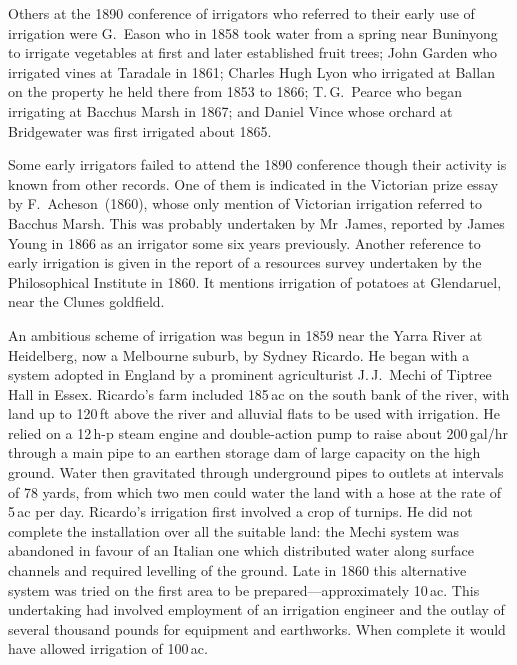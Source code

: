 Others at the 1890 conference of irrigators who referred to their
early use of irrigation were G.~Eason who in 1858 took water from a
spring near Buninyong to irrigate vegetables at first and later
established fruit trees; John Garden who irrigated vines at Taradale
in 1861; Charles Hugh Lyon who irrigated at Ballan on the property he
held there from 1853 to 1866; T.\,G.~Pearce who began irrigating at
Bacchus Marsh in 1867; and Daniel Vince whose orchard at Bridgewater
was first irrigated about 1865.

Some early irrigators failed to attend the 1890 conference though
their activity is known from other records.  One of them is indicated
in the Victorian prize essay by F.~Acheson~(1860), whose only mention
of Victorian irrigation referred to Bacchus Marsh.  This was probably
undertaken by Mr~James, reported by James Young in 1866 as an
irrigator some six years previously.  Another reference to early
irrigation is given in the report of a resources survey undertaken by
the Philosophical Institute in 1860.  It mentions irrigation of
potatoes at Glendaruel, near the Clunes
goldfield.

An ambitious scheme of irrigation was begun in 1859 near the Yarra
River at Heidelberg, now a Melbourne suburb, by Sydney Ricardo.  He
began with a system adopted in England by a prominent agriculturist
J.\,J.~Mechi of Tiptree Hall in Essex.  Ricardo's farm included
185\,ac on the south bank of the river, with land up to 120\,ft above
the river and alluvial flats to be used with irrigation.  He relied on
a 12\,h-p steam engine and double-action pump to raise about
200\,gal/hr through a main pipe to an earthen storage dam of large
capacity on the high ground.  Water then gravitated through
underground pipes to outlets at intervals of 78 yards, from which two
men could water the land with a hose at the rate of 5\,ac per day.
Ricardo's irrigation first involved a crop of turnips.  He did not
complete the installation over all the suitable land: the Mechi system
was abandoned in favour of an Italian one which distributed water
along surface channels and required levelling of the ground.  Late in
1860 this alternative system was tried on the first area to be
prepared---approximately 10\,ac.  This undertaking had involved
employment of an irrigation engineer and the outlay of several
thousand pounds for equipment and earthworks.  When complete it would
have allowed irrigation of 100\,ac.

